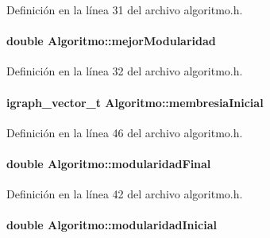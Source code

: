 Definición en la línea 31 del archivo algoritmo.\-h.

\hypertarget{class_algoritmo_a282ec70d907d6923b59c91e425ad493f}{
\paragraph[{mejor\-Modularidad}]{\setlength{\rightskip}{0pt plus 5cm}double Algoritmo\-::mejor\-Modularidad\hspace{0.3cm}{\ttfamily [private]}}}\label{class_algoritmo_a282ec70d907d6923b59c91e425ad493f}


Definición en la línea 32 del archivo algoritmo.\-h.

\hypertarget{class_algoritmo_ada55baff2fa6f00d257d2af78ba10b18}{
\paragraph[{membresia\-Inicial}]{\setlength{\rightskip}{0pt plus 5cm}igraph\-\_\-vector\-\_\-t Algoritmo\-::membresia\-Inicial\hspace{0.3cm}{\ttfamily [private]}}}\label{class_algoritmo_ada55baff2fa6f00d257d2af78ba10b18}


Definición en la línea 46 del archivo algoritmo.\-h.

\hypertarget{class_algoritmo_ad31bad8b81588053130542bc3ffb3d06}{
\paragraph[{modularidad\-Final}]{\setlength{\rightskip}{0pt plus 5cm}double Algoritmo\-::modularidad\-Final\hspace{0.3cm}{\ttfamily [private]}}}\label{class_algoritmo_ad31bad8b81588053130542bc3ffb3d06}


Definición en la línea 42 del archivo algoritmo.\-h.

\hypertarget{class_algoritmo_a2aff6cb6814150fe6abdf5a3458765f8}{
\paragraph[{modularidad\-Inicial}]{\setlength{\rightskip}{0pt plus 5cm}double Algoritmo\-::modularidad\-Inicial\hspace{0.3cm}{\ttfamily [private]}}}\label{class_algoritmo_a2aff6cb6814150fe6abdf5a3458765f8}



